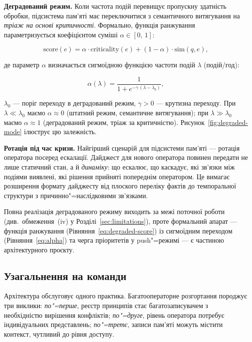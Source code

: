 \documentclass[11pt]{article}
\begin{document}
\textbf{Деградований режим.}
Коли частота подій перевищує пропускну здатність обробки, підсистема пам'яті має переключитися з семантичного витягування на \emph{тріаж на основі критичності}.
Формально, функція ранжування параметризується коефіцієнтом суміші $\alpha \in [0,\,1]$:

\begin{equation}
  \mathrm{score}(e) = \alpha \cdot \mathrm{criticality}(e) + (1-\alpha) \cdot \mathrm{sim}(q, e),
  \label{eq:degraded-score}
\end{equation}

\noindent де параметр $\alpha$ визначається сигмоїдною функцією частоти подій $\lambda$ (подій/год):

\begin{equation}
  \alpha(\lambda) = \frac{1}{1 + e^{-\gamma\,(\lambda - \lambda_0)}},
  \label{eq:alpha}
\end{equation}

\noindent $\lambda_0$ --- поріг переходу в деградований режим, $\gamma > 0$ --- крутизна переходу.
При $\lambda \ll \lambda_0$ маємо $\alpha \approx 0$ (штатний режим, семантичне витягування);
при $\lambda \gg \lambda_0$ маємо $\alpha \approx 1$ (деградований режим, тріаж за критичністю).
Рисунок~\ref{fig:degraded-mode} ілюструє цю залежність.



\textbf{Ротація під час кризи.}
Найгірший сценарій для підсистеми пам'яті --- ротація оператора посеред ескалації.
Дайджест для нового оператора повинен передати не лише статичний стан, а й \emph{динаміку}: що ескалює, що каскадує, які зв'язки між подіями виявлені, які рішення прийняті попереднім оператором.
Це вимагає розширення формату дайджесту від плоского переліку фактів до темпоральної структури з причинно"=наслідковими зв'язками.

Повна реалізація деградованого режиму виходить за межі поточної роботи (див.~обмеження~(iv) у Розділі~\ref{sec:limitations}), проте формальний апарат --- функція ранжування (Рівняння~\ref{eq:degraded-score}) із сигмоїдним переходом (Рівняння~\ref{eq:alpha}) та черга пріоритетів у push"=режимі --- є частиною архітектурного проєкту.

\subsection{Узагальнення на команди}
\label{sec:disc-teams}

Архітектура обслуговує одного практика.
Багатооператорне розгортання породжує три виклики:
\emph{по"=перше}, реєстр принципів стає багатозаписувачем з необхідністю вирішення конфліктів;
\emph{по"=друге}, рівень оператора потребує індивідуальних представлень;
\emph{по"=третє}, записи пам'яті можуть містити контекст, чутливий до рівня доступу.
\end{document}
